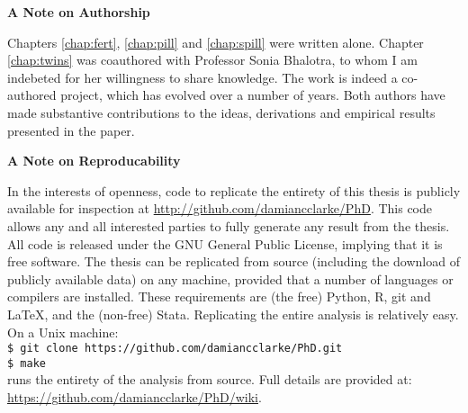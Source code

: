 \begin{center}
\textbf{A Note on Authorship}
\end{center}

Chapters \ref{chap:fert}, \ref{chap:pill} and \ref{chap:spill} were written 
alone.  Chapter \ref{chap:twins} was coauthored with Professor Sonia Bhalotra, 
to whom I am indebeted for her willingness to share knowledge.  The work is 
indeed a co-authored project, which has evolved over a number of years.  Both 
authors have made substantive contributions to the ideas, derivations and 
empirical results presented in the paper.


\begin{center}
\textbf{A Note on Reproducability}
\end{center}

\noindent In the interests of openness, code to replicate the entirety of this 
thesis is publicly available for inspection at 
\href{https://github.com/damiancclarke/PhD}{http://github.com/damiancclarke/PhD}. 
This code allows any and all interested 
parties to fully generate any result from the thesis.  All code is released 
under the GNU General Public License, implying that it is free software.  The 
thesis can be replicated from source (including the download of publicly 
available data) on any machine, provided that a number of languages or compilers 
are installed.  These requirements are (the free) Python, R, git and LaTeX, and 
the (non-free) Stata.  Replicating the entire analysis is 
relatively easy.  On a Unix machine: 
\vspace{1mm} \\
\indent\texttt{\$ git clone https://github.com/damiancclarke/PhD.git}\\
\indent\texttt{\$ make}
\vspace{1mm} \\
runs the entirety of the analysis from source.  Full details are provided at: \\
\href{https://github.com/damiancclarke/PhD/wiki}{https://github.com/damiancclarke/PhD/wiki}. 
